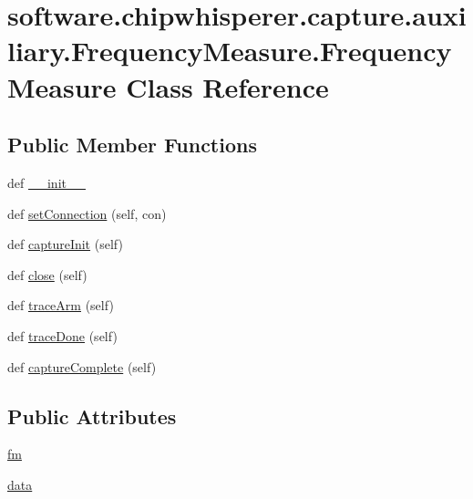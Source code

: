 \hypertarget{classsoftware_1_1chipwhisperer_1_1capture_1_1auxiliary_1_1FrequencyMeasure_1_1FrequencyMeasure}{}\section{software.\+chipwhisperer.\+capture.\+auxiliary.\+Frequency\+Measure.\+Frequency\+Measure Class Reference}
\label{classsoftware_1_1chipwhisperer_1_1capture_1_1auxiliary_1_1FrequencyMeasure_1_1FrequencyMeasure}
\subsection*{Public Member Functions}
\begin{DoxyCompactItemize}
\item 
def \hyperlink{classsoftware_1_1chipwhisperer_1_1capture_1_1auxiliary_1_1FrequencyMeasure_1_1FrequencyMeasure_aa455de749f575b0e5f803688e48ad9ce}{\+\_\+\+\_\+init\+\_\+\+\_\+}
\item 
def \hyperlink{classsoftware_1_1chipwhisperer_1_1capture_1_1auxiliary_1_1FrequencyMeasure_1_1FrequencyMeasure_a692697a8d6e54daac69d3912e2b168c4}{set\+Connection} (self, con)
\item 
def \hyperlink{classsoftware_1_1chipwhisperer_1_1capture_1_1auxiliary_1_1FrequencyMeasure_1_1FrequencyMeasure_a74844641d325dd7f521f2ba1db128194}{capture\+Init} (self)
\item 
def \hyperlink{classsoftware_1_1chipwhisperer_1_1capture_1_1auxiliary_1_1FrequencyMeasure_1_1FrequencyMeasure_a337ad68c0d4ed8db5bc79c32a3999b31}{close} (self)
\item 
def \hyperlink{classsoftware_1_1chipwhisperer_1_1capture_1_1auxiliary_1_1FrequencyMeasure_1_1FrequencyMeasure_ab909431819baa792723303ae36343242}{trace\+Arm} (self)
\item 
def \hyperlink{classsoftware_1_1chipwhisperer_1_1capture_1_1auxiliary_1_1FrequencyMeasure_1_1FrequencyMeasure_a44d64e616ecb28627f05aafe9615b6c3}{trace\+Done} (self)
\item 
def \hyperlink{classsoftware_1_1chipwhisperer_1_1capture_1_1auxiliary_1_1FrequencyMeasure_1_1FrequencyMeasure_a39b62b1dd219710fdee8ddc427f2b5a5}{capture\+Complete} (self)
\end{DoxyCompactItemize}
\subsection*{Public Attributes}
\begin{DoxyCompactItemize}
\item 
\hyperlink{classsoftware_1_1chipwhisperer_1_1capture_1_1auxiliary_1_1FrequencyMeasure_1_1FrequencyMeasure_a6473831ba85318d9286b9554341f15b0}{fm}
\item 
\hyperlink{classsoftware_1_1chipwhisperer_1_1capture_1_1auxiliary_1_1FrequencyMeasure_1_1FrequencyMeasure_af026efe71f339dac13f9890cfaf18bf6}{data}
\end{DoxyCompactItemize}


